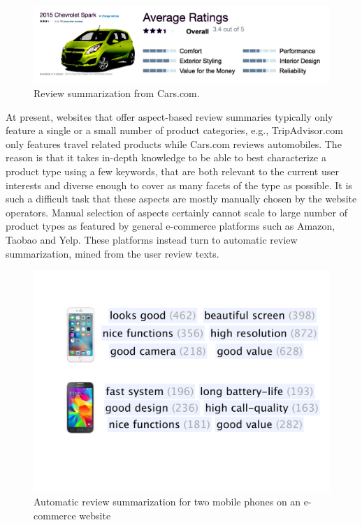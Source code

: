 \begin{figure}[th]
\centering
\includegraphics[width=1.0\columnwidth]{figures/cars}
\caption{Review summarization from Cars.com.}
\label{fig:cars.com}
\end{figure}

At present, websites that offer aspect-based review summaries typically 
only feature a single or a small number of product categories, e.g.,
TripAdvisor.com only features travel related products while Cars.com reviews
automobiles. The reason is that it takes in-depth knowledge to be able to
best characterize a product type using a few keywords, that are both
relevant to the current user interests and diverse enough to cover as many
facets of the type as possible. It is such a difficult task
that these aspects are mostly manually chosen by the website operators.
Manual selection of aspects certainly cannot scale to large number of
product types as featured by general e-commerce platforms such as Amazon,
Taobao and Yelp. These platforms instead turn to automatic review 
summarization, mined from the user review texts. 

\begin{figure}[th]
\centering
\includegraphics[width=0.8\columnwidth]{figures/phrases}
\caption{Automatic review summarization for two mobile phones 
on an e-commerce website}
\label{fig:phrases}
\end{figure}

